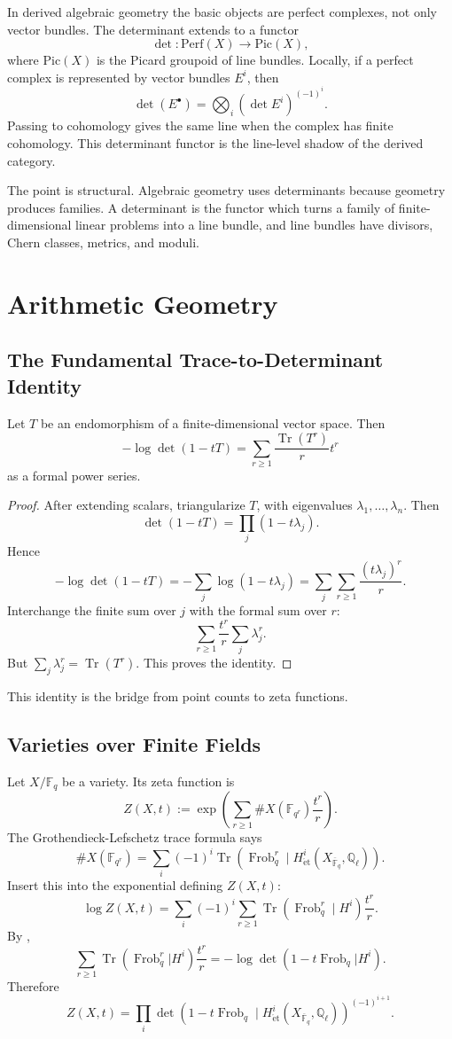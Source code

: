 \documentclass[11pt]{memoir}
\newcommand{\Perf}{\mathrm{Perf}}
\newcommand{\Pic}{\mathrm{Pic}}
\newcommand{\Tr}{\operatorname{Tr}}
\newcommand{\Frob}{\operatorname{Frob}}
\newcommand{\bF}{\mathbb{F}}
\newcommand{\bQ}{\mathbb{Q}}
\begin{document}
In derived algebraic geometry the basic objects are perfect complexes,
not only vector bundles. The determinant extends to a functor
\[
  \det:\Perf(X)\to \Pic(X),
\]
where \(\Pic(X)\) is the Picard groupoid of line bundles. Locally, if
a perfect complex is represented by vector bundles \(E^i\), then
\[
  \det(E^\bullet)=\bigotimes_i(\det E^i)^{(-1)^i}.
\]
Passing to cohomology gives the same line when the complex has finite
cohomology. This determinant functor is the line-level shadow of the
derived category.

The point is structural. Algebraic geometry uses determinants because
geometry produces families. A determinant is the functor which turns a
family of finite-dimensional linear problems into a line bundle, and
line bundles have divisors, Chern classes, metrics, and moduli.

\chapter{Arithmetic Geometry}
\label{ch:arithmetic-geometry}

\section{The Fundamental Trace-to-Determinant Identity}
\label{sec:trace-det-identity}

Let \(T\) be an endomorphism of a finite-dimensional vector space.
Then
\[
  -\log\det(1-tT)
  =
  \sum_{r\geq1}\frac{\Tr(T^r)}{r}t^r
\]
as a formal power series.

\begin{proof}
After extending scalars, triangularize \(T\), with eigenvalues
\(\lambda_1,\dots,\lambda_n\). Then
\[
  \det(1-tT)=\prod_j(1-t\lambda_j).
\]
Hence
\[
  -\log\det(1-tT)
  =
  -\sum_j\log(1-t\lambda_j)
  =
  \sum_j\sum_{r\geq1}\frac{(t\lambda_j)^r}{r}.
\]
Interchange the finite sum over \(j\) with the formal sum over \(r\):
\[
  \sum_{r\geq1}\frac{t^r}{r}\sum_j\lambda_j^r.
\]
But \(\sum_j\lambda_j^r=\Tr(T^r)\). This proves the identity.
\end{proof}

This identity is the bridge from point counts to zeta functions.

\section{Varieties over Finite Fields}
\label{sec:finite-field-zeta}

Let \(X/\bF_q\) be a variety. Its zeta function is
\[
  Z(X,t):=
  \exp\left(\sum_{r\geq1}\#X(\bF_{q^r})\frac{t^r}{r}\right).
\]
The Grothendieck-Lefschetz trace formula says
\[
  \#X(\bF_{q^r})
  =
  \sum_i(-1)^i
  \Tr\left(\Frob_q^r\mid H^i_{\mathrm{\acute et}}(X_{\overline{\bF}_q},\bQ_\ell)\right).
\]
Insert this into the exponential defining \(Z(X,t)\):
\[
  \log Z(X,t)
  =
  \sum_i(-1)^i
  \sum_{r\geq1}
  \Tr\left(\Frob_q^r\mid H^i\right)\frac{t^r}{r}.
\]
By ,
\[
  \sum_{r\geq1}\Tr(\Frob_q^r|H^i)\frac{t^r}{r}
  =
  -\log\det(1-t\Frob_q|H^i).
\]
Therefore
\[
  Z(X,t)
  =
  \prod_i
  \det\left(1-t\Frob_q\mid
  H^i_{\mathrm{\acute et}}(X_{\overline{\bF}_q},\bQ_\ell)\right)^{(-1)^{i+1}}.
\]
\end{document}
